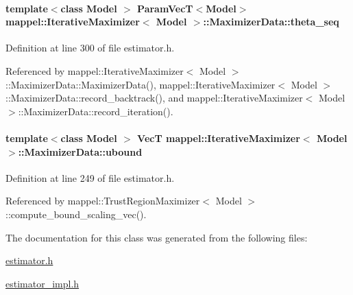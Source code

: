 \paragraph[{\texorpdfstring{theta\+\_\+seq}{theta_seq}}]{\setlength{\rightskip}{0pt plus 5cm}template$<$class Model $>$ {\bf Param\+VecT}$<$Model$>$ {\bf mappel\+::\+Iterative\+Maximizer}$<$ Model $>$\+::Maximizer\+Data\+::theta\+\_\+seq\hspace{0.3cm}{\ttfamily [protected]}}\hypertarget{classmappel_1_1IterativeMaximizer_1_1MaximizerData_a2c8a2c8724b6f507cd8d4a2b6310324f}{}\label{classmappel_1_1IterativeMaximizer_1_1MaximizerData_a2c8a2c8724b6f507cd8d4a2b6310324f}


Definition at line 300 of file estimator.\+h.



Referenced by mappel\+::\+Iterative\+Maximizer$<$ Model $>$\+::\+Maximizer\+Data\+::\+Maximizer\+Data(), mappel\+::\+Iterative\+Maximizer$<$ Model $>$\+::\+Maximizer\+Data\+::record\+\_\+backtrack(), and mappel\+::\+Iterative\+Maximizer$<$ Model $>$\+::\+Maximizer\+Data\+::record\+\_\+iteration().

\paragraph[{\texorpdfstring{ubound}{ubound}}]{\setlength{\rightskip}{0pt plus 5cm}template$<$class Model $>$ {\bf VecT} {\bf mappel\+::\+Iterative\+Maximizer}$<$ Model $>$\+::Maximizer\+Data\+::ubound}\hypertarget{classmappel_1_1IterativeMaximizer_1_1MaximizerData_a222f9843c94b82c5ee9ad7c8af04ab52}{}\label{classmappel_1_1IterativeMaximizer_1_1MaximizerData_a222f9843c94b82c5ee9ad7c8af04ab52}


Definition at line 249 of file estimator.\+h.



Referenced by mappel\+::\+Trust\+Region\+Maximizer$<$ Model $>$\+::compute\+\_\+bound\+\_\+scaling\+\_\+vec().



The documentation for this class was generated from the following files\+:\begin{DoxyCompactItemize}
\item 
\hyperlink{estimator_8h}{estimator.\+h}\item 
\hyperlink{estimator__impl_8h}{estimator\+\_\+impl.\+h}\end{DoxyCompactItemize}
